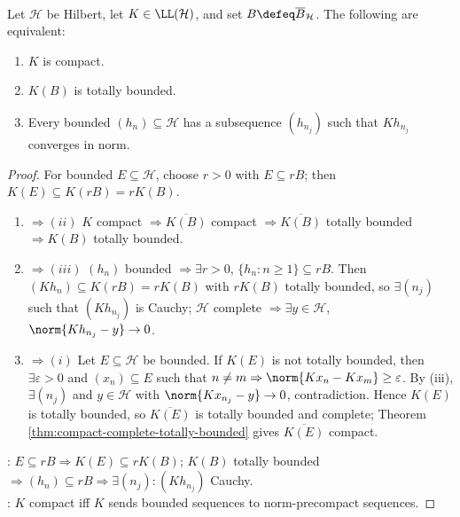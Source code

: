 \begin{proposition} \label{prop:compact-operator-total-bounded-sequential-characterizations} \\
Let $\mathcal{H}$ be Hilbert, let $K\in\LL(\mathcal{H})$, and set $B\defeq\overline{B}_{\mathcal{H}}$. The following are equivalent:
\begin{enumerate}[label=(\roman*)]
\setlength{\itemsep}{0pt}
\item $K$ is compact.
\item $K(B)$ is totally bounded.
\item Every bounded $(h_n)\subseteq\mathcal{H}$ has a subsequence $(h_{n_j})$ such that $Kh_{n_j}$ converges in norm.
\end{enumerate}
\begin{proof}
For bounded $E\subseteq\mathcal{H}$, choose $r>0$ with $E\subseteq rB$; then $K(E)\subseteq K(rB)=rK(B)$.
\begin{enumerate}[label=(\roman*)]
\setlength{\itemsep}{0pt}
\item[$(i)$]$\Rightarrow(ii)$ $K$ compact $\Rightarrow \overline{K(B)}$ compact $\Rightarrow \overline{K(B)}$ totally bounded $\Rightarrow K(B)$ totally bounded.
\item[$(ii)$]$\Rightarrow(iii)$ $(h_n)$ bounded $\Rightarrow \exists r>0$, $\{h_n:n\geq1\}\subseteq rB$. Then $(Kh_n)\subseteq K(rB)=rK(B)$ with $rK(B)$ totally bounded, so $\exists(n_j)$ such that $(Kh_{n_j})$ is Cauchy; $\mathcal{H}$ complete $\Rightarrow \exists y\in\mathcal{H}$, $\norm{Kh_{n_j}-y}\to0$.
\item[$(iii)$]$\Rightarrow(i)$ Let $E\subseteq\mathcal{H}$ be bounded. If $K(E)$ is not totally bounded, then $\exists\varepsilon>0$ and $(x_n)\subseteq E$ such that $n\neq m\Rightarrow\norm{Kx_n-Kx_m}\geq\varepsilon$. By (iii), $\exists(n_j)$ and $y\in\mathcal{H}$ with $\norm{Kx_{n_j}-y}\to0$, contradiction. Hence $K(E)$ is totally bounded, so $\overline{K(E)}$ is totally bounded and complete; Theorem \ref{thm:compact-complete-totally-bounded} gives $\overline{K(E)}$ compact.
\end{enumerate}
: $E\subseteq rB\Rightarrow K(E)\subseteq rK(B)$; $K(B)$ totally bounded $\Rightarrow (h_n)\subseteq rB\Rightarrow\exists(n_j):(Kh_{n_j})$ Cauchy.\\
: $K$ compact iff $K$ sends bounded sequences to norm-precompact sequences.
\end{proof}
\end{proposition}

